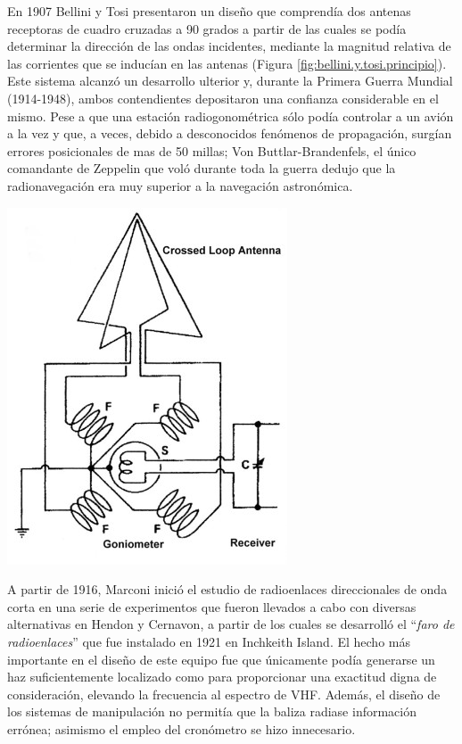 \begin{minipage}[c]{0.5\linewidth}
En 1907 Bellini y Tosi presentaron un dise\~no que comprend\'ia dos antenas receptoras de cuadro cruzadas a 90 grados a partir de las cuales se pod\'ia determinar la direcci\'on de las ondas incidentes, mediante la magnitud relativa de las corrientes que se induc\'ian en las antenas (Figura \ref{fig:bellini.y.tosi.principio}). Este sistema alcanz\'o un desarrollo ulterior y, durante la Primera Guerra Mundial (1914-1948), ambos contendientes depositaron una confianza considerable en el mismo. Pese a que una estaci\'on radiogonom\'etrica s\'olo pod\'ia controlar a un avi\'on a la vez y que, a veces, debido a desconocidos fen\'omenos de propagaci\'on, surg\'ian errores posicionales de mas de 50 millas; Von Buttlar-Brandenfels, el \'unico comandante de Zeppelin que vol\'o durante toda la guerra dedujo que la radionavegaci\'on era muy superior a la navegaci\'on astron\'omica.
\end{minipage}
\begin{minipage}[c]{0.5\linewidth}
\centering
\includegraphics[keepaspectratio,width=0.75\linewidth]{06.radionavegacion/Imagenes/06.02.vor.imagenes/bellinitosiprinciple.jpg}
\label{fig:bellini.y.tosi.principio}
\end{minipage}

A partir de 1916, Marconi inici\'o el estudio de radioenlaces direccionales de onda corta en una serie de experimentos que fueron llevados a cabo con diversas alternativas en Hendon y Cernavon, a partir de los cuales se desarroll\'o el ``\emph{faro de radioenlaces}'' que fue instalado en 1921 en Inchkeith Island. El hecho m\'as importante en el dise\~no de este equipo fue que \'unicamente pod\'ia generarse un haz suficientemente localizado como para proporcionar una exactitud digna de consideraci\'on, elevando la frecuencia al espectro de VHF. Adem\'as, el dise\~no de los sistemas de manipulaci\'on no permit\'ia que la baliza radiase informaci\'on err\'onea; asimismo el empleo del cron\'ometro se hizo innecesario.


